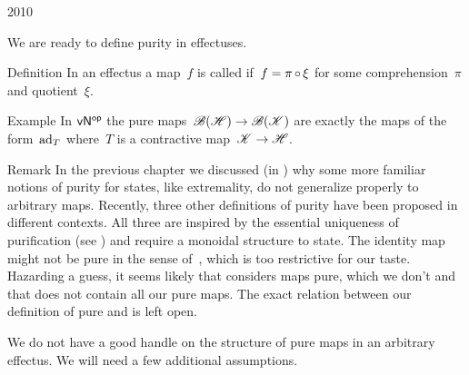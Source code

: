 \begin{parsec}{2010}%
\begin{point}{10}%
We are ready to define purity in effectuses.
\end{point}
\begin{point}{20}{Definition}%
In an effectus a map~$f$ is called 
    if~$f = \pi \mathop{\circ} \xi$
    for some comprehension~$\pi$
    and quotient~$\xi$.
\end{point}
\begin{point}{30}{Example}%
In ${\mathsf{vN}}{^{\mathsf{op}}}$ the pure maps~$\mathscr{B}(\mathscr{H}) \to \mathscr{B}(\mathscr{K})$
    are exactly the maps of the form~$\mathrm{ad}_T$
    where~$T$ is a contractive map~$\mathscr{K} \to \mathscr{H}$.
\end{point}
\begin{point}{40}{Remark}%
In the previous chapter
    we discussed (in )
    why some more familiar notions of purity for states,
    like extremality,
    do not generalize properly to arbitrary maps.
Recently, three other definitions of purity
        have been proposed in different contexts.
        \cite{cunningham2017purity,chiribella2014distinguishability,selby2017leaks}
All three are inspired by the essential uniqueness
    of purification (see )
    and require a monoidal structure to state.
The identity map might not be pure
    in the sense of~\cite{chiribella2014distinguishability},
    which is too restrictive for our taste.
Hazarding a guess,
    it seems likely that
     \cite{cunningham2017purity} considers maps pure, which we don't
     and that \cite{selby2017leaks} does not contain all our pure maps.
The exact relation between
 our definition of pure
    and \cite{cunningham2017purity,selby2017leaks}
    is left open.
\end{point}
\begin{point}{50}%
We do not have a good handle on the structure of pure maps in
    an arbitrary effectus.  We will need a few additional assumptions.
\end{point}
\end{parsec}

